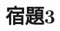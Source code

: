 \documentclass[class=jsarticle, crop=false, dvipdfmx, fleqn]{standalone}
\begin{document}
\section*{宿題3}
\end{document}
